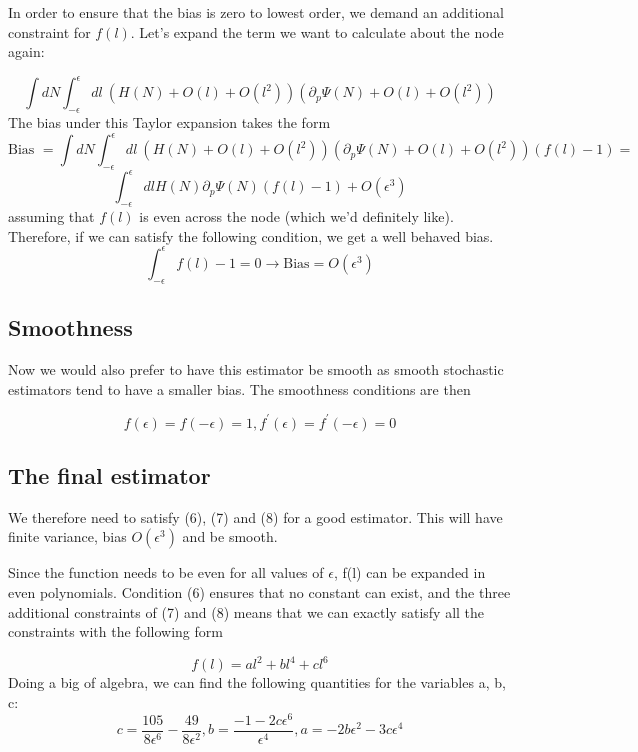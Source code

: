 \documentclass{article}
\begin{document}
In order to ensure that the bias is zero to lowest order, we demand an additional constraint for $f(l)$. 
Let's expand the term we want to calculate about the node again:

$$\int dN \int_{-\epsilon}^{\epsilon}dl \ (H(N) + O(l) + O(l^2)) (\partial_p\Psi(N) + O(l) + O(l^2)) $$
The bias under this Taylor expansion takes the form 
\begin{equation}
\text{Bias } = \int dN \int_{-\epsilon}^{\epsilon}dl \ (H(N) + O(l) + O(l^2)) (\partial_p\Psi(N) + O(l) + O(l^2))( f(l) - 1 ) = 
\end{equation}
$$
\int_{-\epsilon}^{\epsilon} dl H(N)\partial_p\Psi(N)(f(l) - 1) + O(\epsilon^3)
$$
assuming that $f(l)$ is even across the node (which we'd definitely like).
Therefore, if we can satisfy the following condition, we get a well behaved bias.
\begin{equation}
\int_{-\epsilon}^{\epsilon} f(l) - 1 = 0 \rightarrow \text{Bias} = O(\epsilon^3)
\end{equation}

\subsection{Smoothness} 
Now we would also prefer to have this estimator be smooth as smooth stochastic estimators tend to have a smaller bias. The smoothness conditions are then 

\begin{equation}
f(\epsilon) = f(-\epsilon) = 1, f^\prime(\epsilon) = f^\prime(-\epsilon) =0
\end{equation}

\subsection{The final estimator} 
We therefore need to satisfy (6), (7) and (8) for a good estimator. This will have finite variance, bias $O(\epsilon^3)$ and be smooth.

Since the function needs to be even for all values of $\epsilon$, f(l) can be expanded in even polynomials. Condition (6) ensures that no constant can exist, and the three additional constraints of (7) and (8) means that we can exactly satisfy all the constraints with the following form

\begin{equation}
f(l) = al^2 + bl^4 + cl^6 
\end{equation}
Doing a big of algebra, we can find the following quantities for the variables a, b, c:
\begin{equation}
c = \frac{105}{8\epsilon^6} - \frac{49}{8\epsilon^2}, 
b = \frac{-1 - 2c\epsilon^6}{\epsilon^4}, 
a = -2b\epsilon^2 -3c\epsilon^4
\end{equation}
\end{document}
